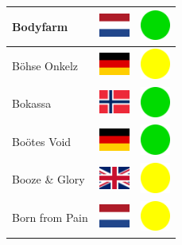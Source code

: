 \documentclass[12pt, a4paper, twoside]{report}
\begin{document}
\begin{center}
\begin{longtable}{|p{5cm}|p{2cm}|p{2cm}|}
 Bodyfarm                                                   & \includegraphics[width=1cm]{4x3/nl} &   \includegraphics[width=1cm]{likes/y} \\ \hline
 Böhse Onkelz                                               & \includegraphics[width=1cm]{4x3/de} &   \includegraphics[width=1cm]{likes/m} \\ \hline
 Bokassa                                                    & \includegraphics[width=1cm]{4x3/no} &   \includegraphics[width=1cm]{likes/y} \\ \hline
 Boötes Void                                                & \includegraphics[width=1cm]{4x3/de} &   \includegraphics[width=1cm]{likes/y} \\ \hline
 Booze \& Glory                                             & \includegraphics[width=1cm]{4x3/gb} &   \includegraphics[width=1cm]{likes/m} \\ \hline
 Born from Pain                                             & \includegraphics[width=1cm]{4x3/nl} &   \includegraphics[width=1cm]{likes/m} \\ \hline

\end{longtable}
\end{center}
\end{document}
